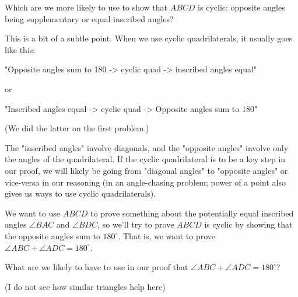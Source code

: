 Which are we more likely to use to show that $ABCD$ is cyclic: opposite angles being supplementary or equal inscribed angles?



This is a bit of a subtle point. When we use cyclic quadrilaterals, it usually goes like this:

"Opposite angles sum to 180 -> cyclic quad -> inscribed angles equal"

or

"Inscribed angles equal -> cyclic quad -> Opposite angles sum to 180"

(We did the latter on the first problem.)

The "inscribed angles" involve diagonals, and the "opposite angles" involve only the angles of the quadrilateral. If the cyclic quadrilateral is to be a key step in our proof, we will likely be going from "diagonal angles" to "opposite angles" or vice-versa in our reasoning (in an angle-chasing problem; power of a point also gives us ways to use cyclic quadrilaterals).

We want to use $ABCD$ to prove something about the potentially equal inscribed angles $\angle BAC$ and $\angle BDC$, so we'll try to prove $ABCD$ is cyclic by showing that the opposite angles sum to $180^\circ.$ That is, we want to prove $\angle ABC + \angle ADC = 180^\circ $.

What are we likely to have to use in our proof that $\angle ABC + \angle ADC = 180^\circ$?

(I do not see how similar triangles help here)



